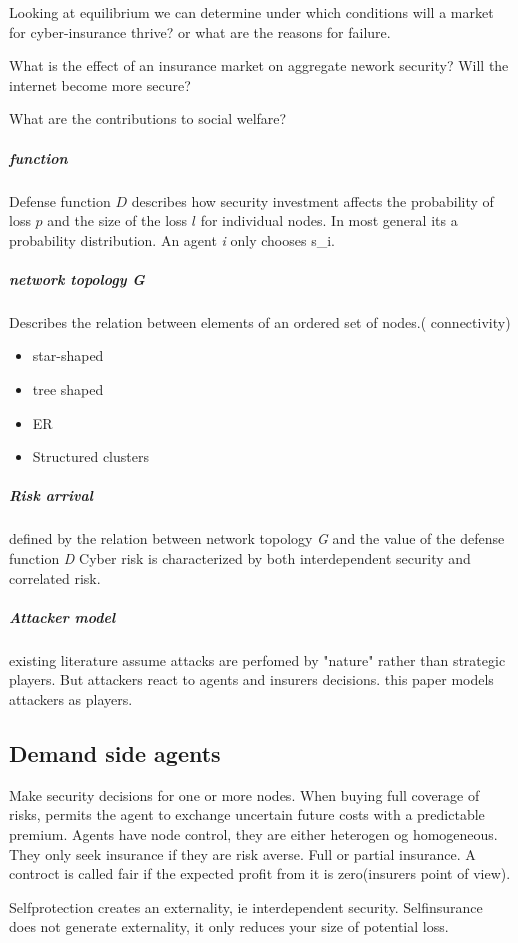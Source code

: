 Looking at equilibrium we can determine under which conditions will a market for cyber-insurance thrive? or what are the reasons for failure.

What is the effect of an insurance market on aggregate nework security? Will the internet become more secure?

What are the contributions to social welfare?

\subparagraph{function}
Defense function \begin{math} D \end{math} describes how security investment affects the probability of loss \begin{math}p \end{math} and the size of the loss  \begin{math}l \end{math} for individual nodes.  In most general its a probability distribution.
An agent \textit{i} only chooses s_i.

\subparagraph{network topology G}
Describes the relation between elements of an ordered set of nodes.( connectivity)
\begin{itemize}[topsep=-1em,parsep=0em,itemsep=0em] 
\item star-shaped \item tree shaped \item ER \item Structured clusters
\end{itemize}
\subparagraph{Risk arrival}
defined by the relation between network topology \textit{G} and the value of the defense function \textit{D}
Cyber risk is characterized by both interdependent security and correlated risk.
\subparagraph{Attacker model}
existing literature assume attacks are perfomed by "nature" rather than strategic players. But attackers react to agents and insurers decisions. this paper models attackers as players. 
\subsection{Demand side agents}
Make security decisions for one or more nodes. When buying full coverage of risks, permits the agent to exchange uncertain future costs with a predictable premium. 
Agents have node control, they are either heterogen og homogeneous. They only seek insurance if they are risk averse. 
Full or partial insurance. 
A controct is called fair if the expected profit from it is zero(insurers point of view).

Selfprotection creates an externality, ie interdependent security.
Selfinsurance does not generate externality, it only reduces your size of potential loss. 

